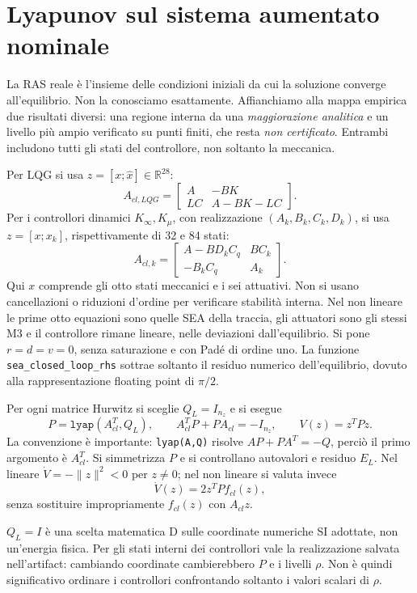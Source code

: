 \section{Lyapunov sul sistema aumentato nominale}
La RAS reale è l'insieme delle condizioni iniziali da cui la soluzione converge
all'equilibrio. Non la conosciamo esattamente. Affianchiamo alla mappa empirica
due risultati diversi: una regione interna da una \emph{maggiorazione analitica}
e un livello più ampio verificato su punti finiti, che resta \emph{non certificato}.
Entrambi includono tutti gli stati del controllore, non soltanto la meccanica.

Per LQG si usa $z=[x;\hat x]\in\mathbb R^{28}$:
\[
A_{cl,LQG}=\begin{bmatrix}A&-BK\\LC&A-BK-LC\end{bmatrix}.
\]
Per i controllori dinamici $K_\infty,K_\mu$, con realizzazione
$(A_k,B_k,C_k,D_k)$, si usa $z=[x;x_k]$, rispettivamente di 32 e 84 stati:
\[
A_{cl,k}=\begin{bmatrix}A-BD_kC_q&BC_k\\-B_kC_q&A_k\end{bmatrix}.
\]
Qui $x$ comprende gli otto stati meccanici e i sei attuativi.
Non si usano cancellazioni o riduzioni d'ordine per verificare stabilità interna.
Nel non lineare le prime otto equazioni sono quelle SEA della traccia, gli
attuatori sono gli stessi M3 e il controllore rimane lineare, nelle deviazioni
dall'equilibrio. Si pone $r=d=v=0$, senza saturazione e con Padé di ordine uno.
La funzione \texttt{sea\_closed\_loop\_rhs} sottrae soltanto il residuo numerico
dell'equilibrio, dovuto alla rappresentazione floating point di $\pi/2$.

Per ogni matrice Hurwitz si sceglie $Q_L=I_{n_z}$ e si esegue
\[
P=\texttt{lyap}(A_{cl}^T,Q_L),\qquad
A_{cl}^TP+PA_{cl}=-I_{n_z},\qquad V(z)=z^TPz.
\]
La convenzione è importante: \texttt{lyap(A,Q)} risolve
$AP+PA^T=-Q$, perciò il primo argomento è $A_{cl}^T$.
Si simmetrizza $P$ e si controllano autovalori e residuo $E_L$.
Nel lineare $\dot V=-\|z\|^2<0$ per $z\ne0$; nel non lineare si valuta invece
\[
\dot V(z)=2z^TPf_{cl}(z),
\]
senza sostituire impropriamente $f_{cl}(z)$ con $A_{cl}z$.

$Q_L=I$ è una scelta matematica D sulle coordinate numeriche SI adottate,
non un'energia fisica. Per gli stati interni dei controllori vale la
realizzazione salvata nell'artifact: cambiando coordinate cambierebbero
$P$ e i livelli $\rho$. Non è quindi significativo ordinare i controllori
confrontando soltanto i valori scalari di $\rho$.

